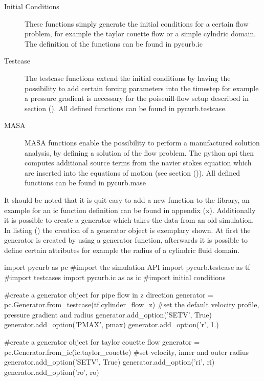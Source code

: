\begin{description}
\item[Initial  Conditions] These functions simply generate the initial conditions for a certain flow problem, for example the taylor couette
                            flow or a simple cylndric domain. The definition of the functions can be found in pycurb.ic
\item[Testcase] The testcase functions extend the initial conditions by having the possibility to add certain forcing parameters into the timestep
                for example a pressure gradient is necessary for the poiseuill-flow setup described in section ().
                All defined functions can be found in pycurb.testcase.
\item[MASA]     MASA functions enable the possibility to perform a  manufactured solution analysis, by defining a solution of the flow problem.
                The python api then computes additional source terms from the navier stokes equation which are inserted into the equations of motion (see section ()).
                All defined functions can be found in pycurb.mase
\end{description}


It should be noted that it is quit easy to add a new function to the library, an example for an ic function definition can be found in appendix (x).
Additionally it is possible to create a generator which takes the data from an old simulation. In listing () the creation of a generator object is
exemplary shown. At first the generator is created by using a generator function, afterwards it is possible to define certain attributes
for example the radius of a cylindric fluid domain.\\

\begin{python} [caption='Generator class usage']
import pycurb as pc #import the simulation API
import pycurb.testcase as tf #import testcases
import pycurb.ic as as ic    #import initial conditions

#create a generator object for pipe flow in z direction
generator = pc.Generator.from_testcase(tf.cylinder_flow_z)
#set the default velocity profile, pressure gradient and radius
generator.add_option('SETV', True)
generator.add_option('PMAX', pmax)
generator.add_option('r', 1.)

#create a generator object for taylor couette flow
generator = pc.Generator.from_ic(ic.taylor_couette)
#set velocity, inner and outer radius
generator.add_option('SETV', True)
generator.add_option('ri', ri)
generator.add_option('ro', ro)
\end{python}

